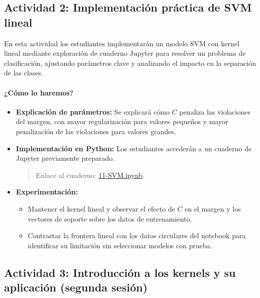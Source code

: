 \documentclass[a4,11pt]{aleph-notas}
\begin{document}
\subsection*{Actividad 2: Implementación práctica de SVM lineal}

En esta actividad los estudiantes implementarán un modelo SVM con kernel lineal mediante exploración de cuaderno Jupyter para resolver un problema de clasificación, ajustando parámetros clave y analizando el impacto en la separación de las clases.

\paragraph{¿Cómo lo haremos?}
\begin{itemize}[leftmargin=*]
    \item \textbf{Explicación de parámetros:}
    Se explicará cómo $C$ penaliza las violaciones del margen, con mayor regularización para valores pequeños y mayor penalización de las violaciones para valores grandes.
    
    \item \textbf{Implementación en Python:} Los estudiantes accederán a un cuaderno de Jupyter previamente preparado.
    \begin{quote}
        Enlace al cuaderno: \href{https://github.com/andres-merino/AprendizajeAutomaticoInicial-05-N0105/blob/main/2-Notebooks/11-SVM.ipynb}{11-SVM.ipynb}.
    \end{quote}
    
    \item \textbf{Experimentación:} 
    \begin{itemize}
        \item Mantener el kernel lineal y observar el efecto de $C$ en el margen y los vectores de soporte sobre los datos de entrenamiento.
        \item Contrastar la frontera lineal con los datos circulares del notebook para identificar su limitación sin seleccionar modelos con prueba.
    \end{itemize}
    
\end{itemize}

\subsection*{Actividad 3: Introducción a los kernels y su aplicación (segunda sesión)}
\end{document}
